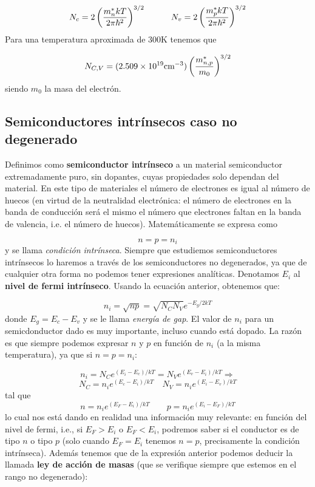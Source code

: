 \begin{equation}
	N_c = 2 \left( \frac{m_n^* kT}{2\pi\hbar^2} \right)^{3/2} \quad \quad \quad
	N_v = 2 \left( \frac{m_p^* kT}{2\pi\hbar^2} \right)^{3/2}
\end{equation}
Para una temperatura aproximada de $300$K tenemos que

\begin{equation}
	N_{C,V} = (2.509\times10^{19} \text{cm}^{-3}) \left( \frac{m_{n,p}^*}{m_0} \right)^{3/2}
\end{equation}
siendo $m_0$ la masa del electrón.
\subsection{Semiconductores intrínsecos caso no degenerado}

Definimos como \textbf{semiconductor intrínseco} a un material semiconductor extremadamente puro, sin dopantes, cuyas propiedades solo dependan del material. En este tipo de materiales el número de electrones es igual al número de huecos (en virtud de la neutralidad electrónica: el número de electrones en la banda de conducción será el mismo el número que electrones faltan en la banda de valencia, i.e. el número de huecos). Matemáticamente se expresa como

\begin{equation}
	n = p = n_i
\end{equation}
y se llama \textit{condición intrínseca}. Siempre que estudiemos semiconductores intrínsecos lo haremos a través de los semiconductores no degenerados, ya que de cualquier otra forma no podemos tener expresiones analíticas. Denotamos $E_i$ al \textbf{nivel de fermi intrínseco}. Usando la ecuación anterior, obtenemos que:

\begin{equation}
	n_i = \sqrt{np} = \sqrt{N_CN_V} e^{-E_g/2kT} 
\end{equation}
donde $E_g=E_c-E_v$ y se le llama \textit{energía de gap}. El valor de $n_i$ para un semicdonductor dado es muy importante, incluso cuando está dopado. La razón es que siempre podemos expresar $n$ y $p$  en función de $n_i$ (a la misma temperatura), ya que si $n=p=n_i$:

\begin{equation*}
	n_i = N_C e^{(E_i-E_c)/kT} = N_V e^{(E_v-E_i)/kT}  \Rightarrow
\end{equation*}
\begin{equation}
	N_C=n_i e^{(E_c-E_i)/kT} \quad N_V = n_i e^{(E_i-E_v)/kT} \label{Ec:01-3-13}
\end{equation}
tal que
\begin{equation}
	n=n_i e^{(E_F-E_i)/kT} \qquad p = n_i e^{(E_i-E_F)/kT} \label{Ec:01-3-14}
\end{equation}
lo cual nos está dando en realidad una información muy relevante: en función del nivel de fermi, i.e., si $E_F>E_i$ o $E_F<E_i$, podremos saber si el conductor es de tipo $n$ o tipo $p$ (solo cuando $E_F=E_i$ tenemos $n=p$, precisamente la condición intrínseca). Además tenemos que de la expresión anterior podemos deducir la llamada \textbf{ley de acción de masas} (que se verifique siempre que estemos en el rango no degenerado):

